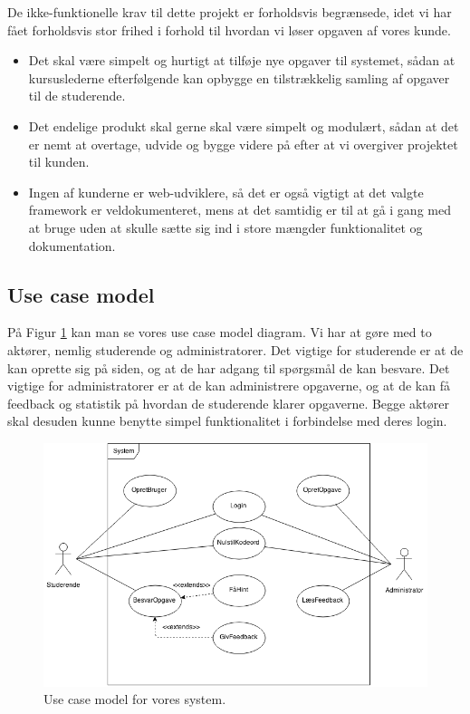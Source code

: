 \documentclass[11pt, a4paper]{article}
\begin{document}
De ikke-funktionelle krav til dette projekt er forholdsvis begrænsede, idet vi har fået forholdsvis stor frihed i forhold til hvordan vi løser opgaven af vores kunde.

\begin{itemize}
\item Det skal være simpelt og hurtigt at tilføje nye opgaver til systemet, sådan at kursuslederne efterfølgende kan opbygge en tilstrækkelig samling af opgaver til de studerende.
\item Det endelige produkt skal gerne skal være simpelt og modulært, sådan at det er nemt at overtage, udvide og bygge videre på efter at vi overgiver projektet til kunden.
\item Ingen af kunderne er web-udviklere, så det er også vigtigt at det valgte framework er veldokumenteret, mens at det samtidig er til at gå i gang med at bruge uden at skulle sætte sig ind i store mængder funktionalitet og dokumentation.
\end{itemize}

\subsection{Use case model}
\label{sub:use_case_model}
På Figur \ref{fig:use_case_model} kan man se vores use case model diagram. Vi har at gøre med to aktører, nemlig studerende og administratorer. Det vigtige for studerende er at de kan oprette sig på siden, og at de har adgang til spørgsmål de kan besvare. Det vigtige for administratorer er at de kan administrere opgaverne, og at de kan få feedback og statistik på hvordan de studerende klarer opgaverne. Begge aktører skal desuden kunne benytte simpel funktionalitet i forbindelse med deres login.

\begin{figure}[h]
  \centering
  \includegraphics[width=1\linewidth]{figures/UseCaseModel.png}
  \caption{Use case model for vores system.}
  \label{fig:use_case_model}
\end{figure}
\FloatBarrier
\end{document}
